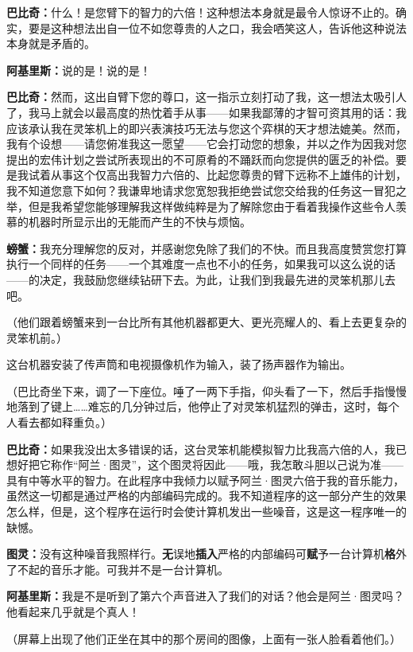 \documentclass[
  12pt,
  twoside,
  openright,
  oldfontcommands,
]{memoir}
\newcommand{\heititext}[1]{{\sffamily\bfseries #1}}
\newcommand{\dialogname}[1]{{\sffamily\bfseries #1}}
\begin{document}
\dialogname{巴比奇：}什么！是您臂下的智力的六倍！这种想法本身就是最令人惊讶不止的。确实，要是这种想法出自一位不如您尊贵的人之口，我会哂笑这人，告诉他这种说法本身就是矛盾的。

\dialogname{阿基里斯：}说的是！说的是！

\dialogname{巴比奇：}然而，这出自臂下您的尊口，这一指示立刻打动了我，这一想法太吸引人了，我马上就会以最高度的热忱着手从事------如果我鄙薄的才智可资其用的话：我应该承认我在灵笨机上的即兴表演技巧无法与您这个弈棋的天才想法媲美。然而，我有个设想------请您俯准我这一愿望------它会打动您的想象，并以之作为因我对您提出的宏伟计划之尝试所表现出的不可原肴的不踊跃而向您提供的匮乏的补偿。要是我试着从事这个仅高出我智力六倍的、比起您尊贵的臂下远称不上雄伟的计划，我不知道您意下如何？我谦卑地请求您宽恕我拒绝尝试您交给我的任务这一冒犯之举，但是我希望您能够理解我这样做纯粹是为了解除您由于看着我操作这些令人羡慕的机器时所显示出的无能而产生的不快与烦恼。

\dialogname{螃蟹：}我充分理解您的反对，并感谢您免除了我们的不快。而且我高度赞赏您打算执行一个同样的任务------一个其难度一点也不小的任务，如果我可以这么说的话------的决定，我鼓励您继续钻研下去。为此，让我们到我最先进的灵笨机那儿去吧。

（他们跟着螃蟹来到一台比所有其他机器都更大、更光亮耀人的、看上去更复杂的灵笨机前。）

这台机器安装了传声筒和电视摄像机作为输入，装了扬声器作为输出。

（巴比奇坐下来，调了一下座位。唾了一两下手指，仰头看了一下，然后手指慢慢地落到了键上\ldots\ldots 难忘的几分钟过后，他停止了对灵笨机猛烈的弹击，这时，每个人看去都如释重负。）

\dialogname{巴比奇：}如果我没出太多错误的话，这台灵笨机能模拟智力比我高六倍的人，我已想好把它称作``阿兰·图灵''，这个图灵将因此------哦，我怎敢斗胆以己说为准------具有中等水平的智力。在此程序中我倾力以赋予阿兰·图灵六倍于我的音乐能力，虽然这一切都是通过严格的内部编码完成的。我不知道程序的这一部分产生的效果怎么样，但是，这个程序在运行时会使计算机发出一些噪音，这是这一程序唯一的缺憾。

\dialogname{图灵：}没有这种噪音我照样行。\heititext{无}误地\heititext{插入}严格的内部编码可\heititext{赋}予一台计算机\heititext{格}外了不起的音乐才能。可我并不是一台计算机。

\dialogname{阿基里斯：}我是不是听到了第六个声音进入了我们的对话？他会是阿兰·图灵吗？他看起来几乎就是个真人！

（屏幕上出现了他们正坐在其中的那个房间的图像，上面有一张人脸看着他们。）
\end{document}
